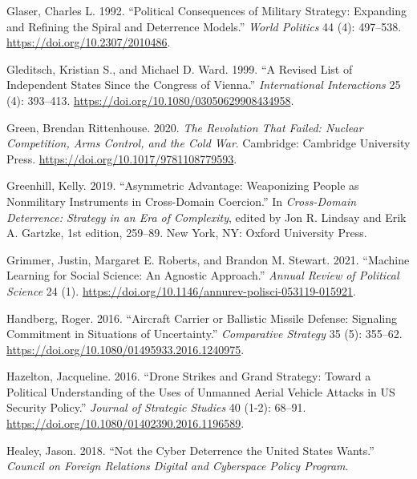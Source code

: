 \documentclass[
]{article}
\begin{document}
\leavevmode\hypertarget{ref-glaser_politicalconsequencesmilitary_1992}{}%
Glaser, Charles L. 1992. ``Political Consequences of Military Strategy: Expanding and Refining the Spiral and Deterrence Models.'' \emph{World Politics} 44 (4): 497--538. \url{https://doi.org/10.2307/2010486}.

\leavevmode\hypertarget{ref-gleditsch_revisedlistindependent_1999}{}%
Gleditsch, Kristian S., and Michael D. Ward. 1999. ``A Revised List of Independent States Since the Congress of Vienna.'' \emph{International Interactions} 25 (4): 393--413. \url{https://doi.org/10.1080/03050629908434958}.

\leavevmode\hypertarget{ref-green_revolutionthatfailed_2020}{}%
Green, Brendan Rittenhouse. 2020. \emph{The Revolution That Failed: Nuclear Competition, Arms Control, and the Cold War}. Cambridge: Cambridge University Press. \url{https://doi.org/10.1017/9781108779593}.

\leavevmode\hypertarget{ref-greenhill_asymmetricadvantageweaponizing_2019}{}%
Greenhill, Kelly. 2019. ``Asymmetric Advantage: Weaponizing People as Nonmilitary Instruments in Cross-Domain Coercion.'' In \emph{Cross-Domain Deterrence: Strategy in an Era of Complexity}, edited by Jon R. Lindsay and Erik A. Gartzke, 1st edition, 259--89. New York, NY: Oxford University Press.

\leavevmode\hypertarget{ref-grimmer_machinelearningsocial_2021}{}%
Grimmer, Justin, Margaret E. Roberts, and Brandon M. Stewart. 2021. ``Machine Learning for Social Science: An Agnostic Approach.'' \emph{Annual Review of Political Science} 24 (1). \url{https://doi.org/10.1146/annurev-polisci-053119-015921}.

\leavevmode\hypertarget{ref-handberg_aircraftcarrierballistic_2016}{}%
Handberg, Roger. 2016. ``Aircraft Carrier or Ballistic Missile Defense: Signaling Commitment in Situations of Uncertainty.'' \emph{Comparative Strategy} 35 (5): 355--62. \url{https://doi.org/10.1080/01495933.2016.1240975}.

\leavevmode\hypertarget{ref-hazelton_dronestrikesgrand_2016}{}%
Hazelton, Jacqueline. 2016. ``Drone Strikes and Grand Strategy: Toward a Political Understanding of the Uses of Unmanned Aerial Vehicle Attacks in US Security Policy.'' \emph{Journal of Strategic Studies} 40 (1-2): 68--91. \url{https://doi.org/10.1080/01402390.2016.1196589}.

\leavevmode\hypertarget{ref-healey_notcyberdeterrence_2018}{}%
Healey, Jason. 2018. ``Not the Cyber Deterrence the United States Wants.'' \emph{Council on Foreign Relations Digital and Cyberspace Policy Program}.
\end{document}
